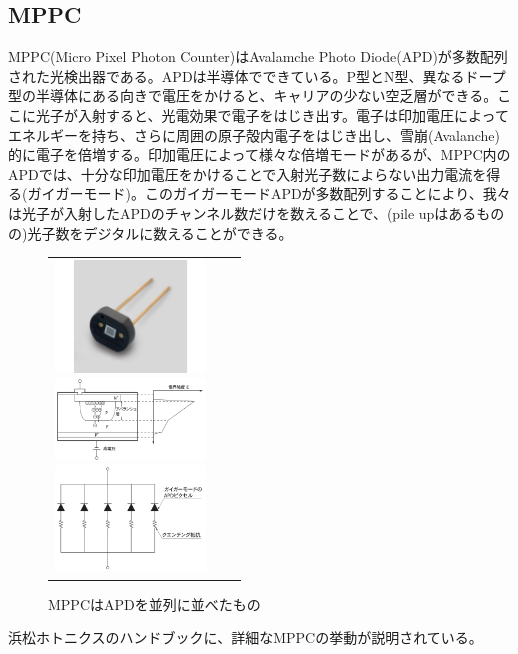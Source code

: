 \documentclass[10pt]{ujarticle}
\begin{document}
\subsection{MPPC}
MPPC(Micro Pixel Photon Counter)はAvalamche Photo Diode(APD)が多数配列された光検出器である。APDは半導体でできている。P型とN型、異なるドープ型の半導体にある向きで電圧をかけると、キャリアの少ない空乏層ができる。ここに光子が入射すると、光電効果で電子をはじき出す。電子は印加電圧によってエネルギーを持ち、さらに周囲の原子殻内電子をはじき出し、雪崩(Avalanche)的に電子を倍増する。印加電圧によって様々な倍増モードがあるが、MPPC内のAPDでは、十分な印加電圧をかけることで入射光子数によらない出力電流を得る(ガイガーモード)。このガイガーモードAPDが多数配列することにより、我々は光子が入射したAPDのチャンネル数だけを数えることで、(pile upはあるものの)光子数をデジタルに数えることができる。
\begin{figure}[h]
\begin{tabular}{ccc}
\begin{minipage}[t]{0.33\hsize}
\begin{center}
\includegraphics[width=4cm]{mppc.jpg}
\end{center}
\caption{MPPC}
\end{minipage}
\begin{minipage}[t]{0.33\hsize}
\begin{center}
\includegraphics[width=4cm]{APDstructure.PNG}
\end{center}
\caption{APD}
\end{minipage}
\begin{minipage}[t]{0.33\hsize}
\begin{center}
\includegraphics[width=4cm]{QuenchingArray.PNG}
\end{center}
\caption{MPPCはAPDを並列に並べたもの}
\end{minipage}
\end{tabular}
\end{figure}
浜松ホトニクスのハンドブックに、詳細なMPPCの挙動が説明されている。\cite{hamamatsu}
\end{document}
